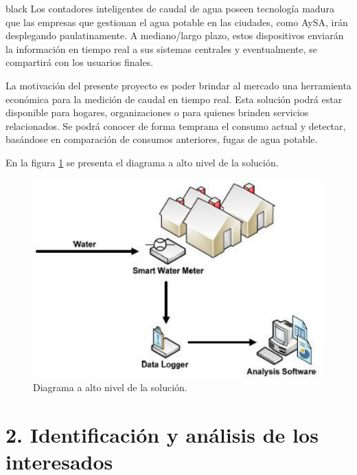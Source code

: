 \documentclass[
11pt, %
codirector, %
]{charter}
\begin{document}
\begin{consigna}{black}
Los contadores inteligentes de caudal de agua poseen tecnología madura que las empresas que gestionan el agua potable en las ciudades, como AySA, irán desplegando paulatinamente. A mediano/largo plazo, estos dispositivos enviarán la información en tiempo real a sus sistemas centrales y eventualmente, se compartirá con los usuarios finales.

La motivación del presente proyecto es poder brindar al mercado una herramienta económica para la medición de caudal en tiempo real. Esta solución podrá estar disponible para hogares, organizaciones o para quienes brinden servicios relacionados. Se podrá conocer de forma temprana el consumo actual y detectar, basándose en comparación de consumos anteriores, fugas de agua potable.

En la figura \ref{fig:diagHLSolucion} se presenta el diagrama a alto nivel de la solución.



\begin{figure}[htpb]
\centering 
\includegraphics[width=.8\textwidth]{./Figuras/diagHLSolucion.png} 
\caption{Diagrama a alto nivel de la solución.}
\label{fig:diagHLSolucion}
\end{figure}

\vspace{25px}

\end{consigna}


\section{2. Identificación y análisis de los interesados}
\label{sec:interesados}
\end{document}
